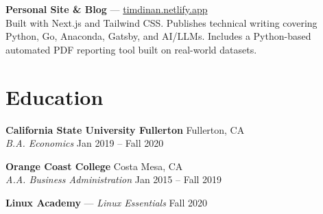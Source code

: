 \documentclass[10pt, letterpaper]{article}
\begin{document}
\noindent\textbf{Personal Site \& Blog} ---
\href{https://timdinan.netlify.app}{timdinan.netlify.app} \\
Built with Next.js and Tailwind CSS. Publishes technical writing covering
Python, Go, Anaconda, Gatsby, and AI/LLMs. Includes a Python-based automated
PDF reporting tool built on real-world datasets.

\section{Education}

\noindent\textbf{California State University Fullerton} \hfill Fullerton, CA \\
\textit{B.A. Economics} \hfill Jan 2019 -- Fall 2020

\vspace{2pt}

\noindent\textbf{Orange Coast College} \hfill Costa Mesa, CA \\
\textit{A.A. Business Administration} \hfill Jan 2015 -- Fall 2019

\vspace{2pt}

\noindent\textbf{Linux Academy} --- \textit{Linux Essentials} \hfill Fall 2020
\end{document}
